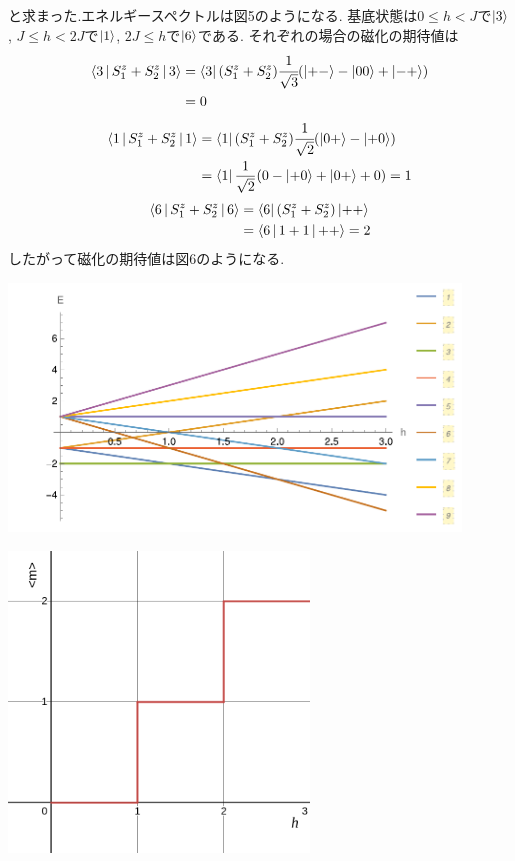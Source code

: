 \documentclass[uplatex,a4j,11pt,dvipdfmx]{jsarticle}
\makeatletter
\def\fgcaption{\def\@captype{figure}\caption}
\def\fgcaption{\def\@captype{figure}\caption}
\makeatother
\begin{document}
と求まった.エネルギースペクトルは図5のようになる.
基底状態は$0\leq h<J$で$\Ket{3}$, $J\leq h<2J$で$\Ket{1}$, $2J\leq h$で$\Ket{6}$である.
それぞれの場合の磁化の期待値は
\begin{align}
  \begin{split}
    \Braket{3|S_1^z+S_2^z|3}&=\Bra{3}(S_1^z+S_2^z)\cfrac{1}{\sqrt{3}}(\Ket{+-}-\Ket{00}+\Ket{-+})\\
    &=0
  \end{split}
\end{align}
\begin{align}
  \begin{split}
    \Braket{1|S_1^z+S_2^z|1}&=\Bra{1}(S_1^z+S_2^z)\cfrac{1}{\sqrt{2}}(\Ket{0+}-\Ket{+0})\\
    &=\Bra{1}\frac{1}{\sqrt{2}}(0-\Ket{+0}+\Ket{0+}+0)=1
  \end{split}
\end{align}
\begin{align}
  \begin{split}
    \Braket{6|S_1^z+S_2^z|6}&=\Bra{6}(S_1^z+S_2^z)\Ket{++}\\
    &=\Braket{6|1+1|++}=2
  \end{split}
\end{align}
したがって磁化の期待値は図6のようになる.
\begin{center}
  \includegraphics[width=12cm]{espec.pdf}
  \fgcaption{エネルギースペクトル($J=1$の場合)}
\end{center}
\begin{center}
  \includegraphics[width=8cm]{mmean_s1.png}
  \fgcaption{磁化の期待値($J=1$の場合)}
\end{center}
\end{document}
